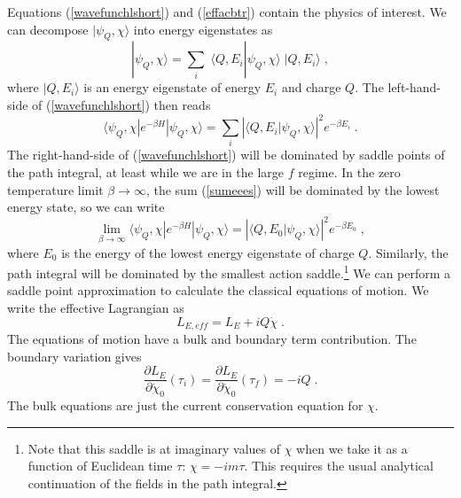 \documentclass[11pt]{article}
\numberwithin{equation}{section}
\newcommand{\be}{\begin{equation}} \newcommand{\ee}{\end{equation}}
\begin{document}
Equations (\ref{wavefunchlshort}) and (\ref{effacbtr}) contain the physics of interest. We can decompose $| \psi_Q,\chi  \rangle $ into energy eigenstates as
\be
| \psi_Q,\chi \rangle = \sum_i \;\langle Q, E_i | \psi_Q,\chi  \rangle \;|  Q, E_i \rangle \;,
\ee
where $|  Q, E_i \rangle$ is an energy eigenstate of energy $E_i$ and charge $Q$. The left-hand-side of (\ref{wavefunchlshort}) then reads
\be
\langle \psi_Q,\chi | e^{-\beta H } | \psi_Q,\chi  \rangle = \sum_i \left|\langle Q, E_i | \psi_Q,\chi \rangle\right|^2 e^{-\beta E_i} \;.
\label{sumeees}
\ee
The right-hand-side of (\ref{wavefunchlshort}) will be dominated by saddle points of the path integral, at least while we are in the large $f$ regime. 
In the zero temperature limit $\beta \rightarrow \infty$, the sum (\ref{sumeees}) will be dominated by the lowest energy state, so we can write
\be
\lim_{\beta \rightarrow \infty}  \langle \psi_Q,\chi | e^{-\beta H } | \psi_Q,\chi \rangle= \left|\langle Q, E_0 | \psi_Q,\chi  \rangle\right|^2 e^{-\beta E_0} \;,
\ee
where $E_0$ is the energy of the lowest energy eigenstate of charge $Q$. Similarly, the path integral will be dominated by the smallest action saddle.\footnote{Note that this saddle is at imaginary values of $\chi$ when we take it as a function of Euclidean time $\tau$: $\chi = -i m \tau$. This requires the usual analytical continuation of the fields in the path integral.} We can perform a saddle point approximation to calculate the classical equations of motion. We write the effective Lagrangian as
\be
L_{E,eff}  = L_E + i Q \dot{\chi} \;.
\label{leff}
\ee 
The equations of motion have a bulk and boundary term contribution. The boundary variation gives
\be
\frac{\partial L_E}{\partial \dot{\chi}_0} \left( \tau_i \right) = \frac{\partial L_E}{\partial \dot{\chi}_0} \left( \tau_f \right) = - i Q \;.
\label{bountxl}
\ee
The bulk equations are just the current conservation equation for $\chi$. 
\end{document}
